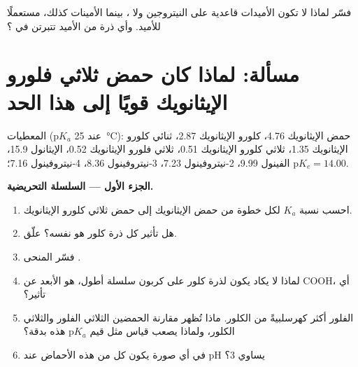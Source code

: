 \begin{exercise}[$\star\star\star$]\label{exo:b1:electronic-effects:12}
فسّر لماذا لا تكون الأميدات قاعدية على النيتروجين ولا ،
بينما الأمينات كذلك، مستعملًا  للأميد.
وأي ذرة من الأميد تتبرتن في ؟
\end{exercise}

\section{مسألة: لماذا كان حمض ثلاثي فلورو الإيثانويك قويًا إلى هذا الحد}

\begin{problem}
\label{pb:b1:electronic-effects:1}
المعطيات ($\mathrm{p}K_a$ عند \qty{25}{\celsius}): حمض الإيثانويك 4.76،
كلورو الإيثانويك 2.87، ثنائي كلورو الإيثانويك 1.35، ثلاثي كلورو الإيثانويك 0.51،
ثلاثي فلورو الإيثانويك 0.52، الإيثانول 15.9، الفينول 9.99، 2-نيتروفينول 7.23،
3-نيتروفينول 8.36، 4-نيتروفينول 7.16؛ $\mathrm{p}K_e = 14.00$.

\medskip
\noindent\textbf{الجزء الأول --- السلسلة التحريضية.}
\begin{enumerate}
  \item احسب نسبة $K_a$ لكل خطوة من حمض الإيثانويك إلى
        حمض ثلاثي كلورو الإيثانويك.
  \item هل تأثير كل ذرة كلور هو نفسه؟ علّق.
  \item فسّر المنحى .
  \item لماذا لا يكاد يكون لذرة كلور على كربون سلسلة أطول، هو الأبعد
        عن COOH، أي تأثير؟
  \item الفلور أكثر كهرسلبيةً من الكلور. ماذا تُظهر
        مقارنة الحمضين الثلاثي الفلور والثلاثي الكلور، ولماذا
        يصعب قياس مثل قيم $\mathrm{p}K_a$ هذه بدقة؟
  \item في أي صورة يكون كل من هذه الأحماض عند pH يساوي 3؟
\end{enumerate}


\end{problem}
